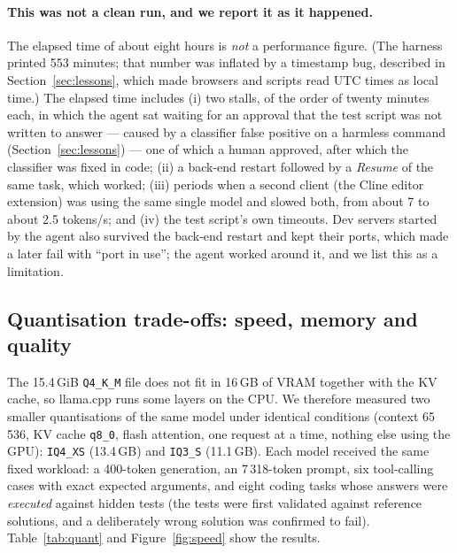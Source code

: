 \paragraph{This was not a clean run, and we report it as it happened.} The elapsed time of about eight hours is \emph{not} a performance figure. (The harness printed 553 minutes; that number was inflated by a timestamp bug, described in Section~\ref{sec:lessons}, which made browsers and scripts read UTC times as local time.) The elapsed time includes (i) two stalls, of the order of twenty minutes each, in which the agent sat waiting for an approval that the test script was not written to answer --- caused by a classifier false positive on a harmless  command (Section~\ref{sec:lessons}) --- one of which a human approved, after which the classifier was fixed in code; (ii) a back-end restart followed by a \emph{Resume} of the same task, which worked; (iii) periods when a second client (the Cline editor extension) was using the same single model and slowed both, from about 7 to about 2.5 tokens/s; and (iv) the test script's own timeouts. Dev servers started by the agent also survived the back-end restart and kept their ports, which made a later  fail with ``port in use''; the agent worked around it, and we list this as a limitation.

\subsection{Quantisation trade-offs: speed, memory and quality}\label{sec:quant}
The 15.4\,GiB \texttt{Q4\_K\_M} file does not fit in 16\,GB of VRAM together with the KV cache, so llama.cpp runs some layers on the CPU. We therefore measured two smaller quantisations of the same model under identical conditions (context 65\,536, KV cache \texttt{q8\_0}, flash attention, one request at a time, nothing else using the GPU): \texttt{IQ4\_XS} (13.4\,GB) and \texttt{IQ3\_S} (11.1\,GB). Each model received the same fixed workload: a 400-token generation, an 7\,318-token prompt, six tool-calling cases with exact expected arguments, and eight coding tasks whose answers were \emph{executed} against hidden tests (the tests were first validated against reference solutions, and a deliberately wrong solution was confirmed to fail). Table~\ref{tab:quant} and Figure~\ref{fig:speed} show the results.


